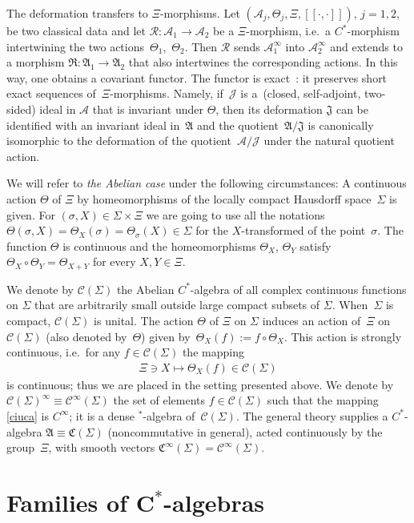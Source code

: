 \documentclass[11pt]{article}
\def\A{{\mathcal A}}
\def\Th{\Theta}
\def\AA{\mathfrak A}
\def\C{\mathcal{C}}
\def\R{\mathcal{R}}
\def\CC{{\mathfrak C}}
\def\RR{{\mathfrak R}}
\def\J{\mathcal J}
\def\JJ{\mathfrak J}
\def\Si{\Sigma}
\providecommand{\CC}{\mathfrak{C}}
\begin{document}
The deformation transfers to $\Xi$-morphisms. Let
$\left(\A_j,\Theta_j,\Xi,[\![\cdot,\cdot]\!]\right)$, $j=1,2$, be two classical data and
let $\R:\A_1\to\A_2$ be a $\Xi$-morphism, i.e.\ a $C^*$-morphism intertwining the
two actions~$\Theta_1$,~$\Theta_2$. Then $\R$ sends $\A^\infty_1$ into $\A^\infty_2$ and extends to a morphism
$\RR:\AA_1\to\AA_2$ that also intertwines the corresponding actions. In this way, one obtains a
covariant functor.
The functor is exact~\cite{Rie1}: it preserves short exact sequences of~$\Xi$-morphisms. Namely, if~$\J$ is a~(closed,
self-adjoint, two-sided) ideal in $\A$ that is invariant under $\Theta$, then its deformation $\JJ$ can be
identif\/ied with an invariant ideal in~$\AA$ and the quotient~$\AA/\JJ$ is canonically isomorphic to the
deformation  of the quotient~$\A/\J$  under the natural quotient action.

We will refer to {\it the Abelian case} under the following circumstances:
A continuous action $\Theta$ of $\Xi$ by homeomorphisms of the locally compact Hausdorf\/f space~$\Sigma$ is given. For
$(\sigma,X)\in\Sigma\times\Xi$ we are going to use all the notations
$\Theta(\sigma,X)=\Theta_X(\sigma)=\Theta_\sigma(X)\in\Sigma$ for the $X$-transformed of the point~$\sigma$.
The function $\Theta$ is continuous and the homeomorphisms
$\Th_X$, $\Th_Y$ satisfy $\Th_X\circ\Th_Y=\Th_{X+Y}$ for every $X,Y\in\Xi$.

We denote by $\C(\Sigma)$ the Abelian $C^*$-algebra of all complex continuous functions on $\Sigma$
that are arbitrarily small outside large compact subsets of $\Sigma$. When~$\Sigma$ is compact,
$\C(\Si)$ is unital. The action $\Theta$ of $\Xi$ on $\Sigma$ induces an action of~$\Xi$ on
$\C(\Si)$ (also denoted by~$\Theta$) given by~$\Theta_X(f):=f\circ\Theta_X$.
This action is strongly continuous, i.e.\ for any $f\in\C(\Sigma)$ the mapping
\begin{gather}\label{ciuca}
\Xi\ni X\mapsto\Theta_X(f)\in\C(\Sigma)
\end{gather}
is continuous; thus we are placed in the setting presented above.
We denote by $\C(\Si)^\infty\equiv\C^\infty(\Sigma)$ the set of elements $f\in\C(\Sigma)$ such that the
mapping \eqref{ciuca} is $C^\infty$; it is a dense $^*$-algebra of~$\C(\Sigma)$.
The general theory supplies a $C^*$-algebra $\AA\equiv\CC(\Si)$ (noncommutative in general),
acted continuously by the group~$\Xi$, with
smooth vectors $\CC^\infty(\Si)=\C^\infty(\Si)$.


\section[Families of $C^*$-algebras]{Families of $\boldsymbol{C^*}$-algebras}\label{secintra}
\end{document}
